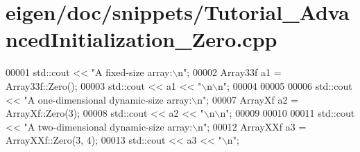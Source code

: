 \hypertarget{eigen_2doc_2snippets_2_tutorial___advanced_initialization___zero_8cpp_source}{}\section{eigen/doc/snippets/\+Tutorial\+\_\+\+Advanced\+Initialization\+\_\+\+Zero.cpp}
\label{eigen_2doc_2snippets_2_tutorial___advanced_initialization___zero_8cpp_source}

\begin{DoxyCode}
00001 std::cout << \textcolor{stringliteral}{"A fixed-size array:\(\backslash\)n"};
00002 Array33f a1 = Array33f::Zero();
00003 std::cout << a1 << \textcolor{stringliteral}{"\(\backslash\)n\(\backslash\)n"};
00004 
00005 
00006 std::cout << \textcolor{stringliteral}{"A one-dimensional dynamic-size array:\(\backslash\)n"};
00007 ArrayXf a2 = ArrayXf::Zero(3);
00008 std::cout << a2 << \textcolor{stringliteral}{"\(\backslash\)n\(\backslash\)n"};
00009 
00010 
00011 std::cout << \textcolor{stringliteral}{"A two-dimensional dynamic-size array:\(\backslash\)n"};
00012 ArrayXXf a3 = ArrayXXf::Zero(3, 4);
00013 std::cout << a3 << \textcolor{stringliteral}{"\(\backslash\)n"};
\end{DoxyCode}
